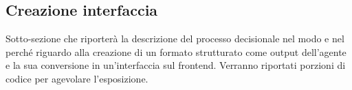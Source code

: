 \subsection{Creazione interfaccia}

Sotto-sezione che riporterà la descrizione del processo decisionale nel modo e nel perché riguardo alla creazione di un formato strutturato come output dell'agente e la sua conversione in un'interfaccia sul frontend.
Verranno riportati porzioni di codice per agevolare l'esposizione.
